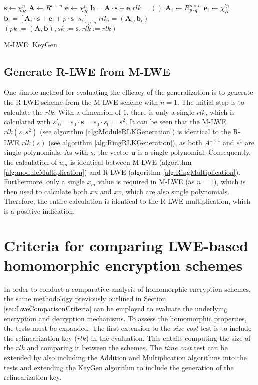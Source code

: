 \begin{algorithm}[htb]
  \begin{algorithmic}[1]
    \STATE $\textbf{s} \leftarrow \chi_R^n$
    \STATE $\textbf{A} \leftarrow R^{n \times n}$
    \STATE $\textbf{e} \leftarrow \chi_R^n$
    \STATE $\textbf{b} = \textbf{A}\cdot \textbf{s}+\textbf{e}$
    \STATE $rlk = ()$
    \STATE $\textbf{A}_i \leftarrow R_{p \cdot q}^{n \times n}$
    \STATE $\textbf{e}_i \leftarrow \chi_R^{'n}$
    \STATE $\textbf{b}_i = [\textbf{A}_i\cdot \textbf{s}+\textbf{e}_i+p\cdot \textbf{s} \cdot s_i]_{p \cdot q}$
    \STATE $rlk_i = (\textbf{A}_i, \textbf{b}_i)$
    \ENDFOR
    \RETURN $(pk:=(\textbf{A}, \textbf{b}), sk:=\textbf{s}, rlk:= rlk )$
  \end{algorithmic}
  \caption{M-LWE: KeyGen}
  \label{alg:HomomorphKeyGen}
\end{algorithm}

\subsection*{Generate R-LWE from M-LWE}

One simple method for evaluating the efficacy of the generalization is to generate the R-LWE scheme from the M-LWE scheme with $n=1$. The initial step is to calculate the $rlk$. With a dimension of $1$, there is only a single $rlk$, which is calculated with $s'_0 = s_0 \cdot \textbf{s} = s_0 \cdot s_0 = s^2$. It can be seen that the M-LWE $rlk(s, s^2)$ (see algorithm \ref{alg:ModuleRLKGeneration}) is identical to the R-LWE $rlk(s)$ (see algorithm \ref{alg:RingRLKGeneration}), as both $A^{1 \times 1}$ and $e^1$ are single polynomials. As with $s$, the vector $\textbf{u}$ is a single polynomial. Consequently, the calculation of $u_m$ is identical between M-LWE (algorithm \ref{alg:moduleMultiplication}) and R-LWE (algorithm \ref{alg:RingMultiplication}). Furthermore, only a single $x_m$ value is required in M-LWE (as $n=1$), which is then used to calculate both $xu$ and $xv$, which are also single polynomials. Therefore, the entire calculation is identical to the R-LWE multiplication, which is a positive indication.


\section{Criteria for comparing LWE-based homomorphic encryption schemes}
\label{sec:HomomorphCriteria}

In order to conduct a comparative analysis of homomorphic encryption schemes, the same methodology previously outlined in Section \ref{sec:LweComparisonCriteria} can be employed to evaluate the underlying encryption and decryption mechanisms. To assess the homomorphic properties, the tests must be expanded. The first extension to the \textit{size cost} test is to include the relinearization key ($rlk$) in the evaluation. This entails computing the size of the $rlk$ and comparing it between the schemes. The \textit{time cost} test can be extended by also including the Addition and Multiplication algorithms into the tests and extending the KeyGen algorithm to include the generation of the relinearization key.

